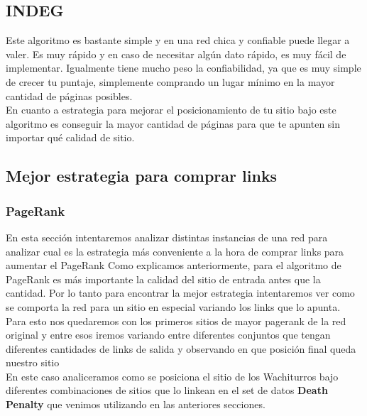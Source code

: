 \subsection{INDEG}
Este algoritmo es bastante simple y en una red chica y confiable puede llegar a valer. Es muy rápido y en caso de necesitar algún dato rápido, es muy fácil de implementar. Igualmente tiene mucho peso la confiabilidad, ya que es muy simple de crecer tu puntaje, simplemente comprando un lugar mínimo en la mayor cantidad de páginas posibles.\\
En cuanto a estrategia para mejorar el posicionamiento de tu sitio bajo este algoritmo es conseguir la mayor cantidad de páginas para que te apunten sin importar qué calidad de sitio.


\subsection{Mejor estrategia para comprar links}
\subsubsection{PageRank}

En esta sección intentaremos analizar distintas instancias de una red para analizar cual es la estrategia más conveniente a la hora de comprar links para aumentar el PageRank 
Como explicamos anteriormente, para el algoritmo de PageRank es más importante la calidad del sitio de entrada antes que la cantidad. Por lo tanto para encontrar la mejor estrategia intentaremos ver como se comporta la red para un sitio en especial variando los links que lo apunta. Para esto nos quedaremos con los primeros sitios de mayor pagerank de la red original y entre esos iremos variando entre diferentes conjuntos que tengan diferentes cantidades de links de salida y observando en que posición final queda nuestro sitio \\
En este caso analiceramos como se posiciona el sitio de los Wachiturros bajo diferentes combinaciones de sitios que lo linkean en el set de datos \textbf{Death Penalty} que venimos utilizando en las anteriores secciones.\\


